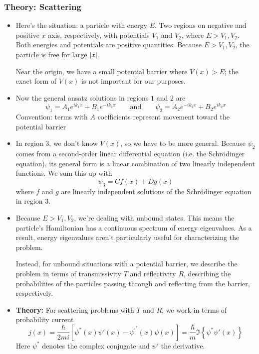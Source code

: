 \documentclass[11pt, a4paper]{article}
\newcommand{\eqtext}[1]{\qquad \text{#1} \qquad}
\newcommand{\schro}{Schr\"{o}dinger\xspace}
\begin{document}
\subsubsection{Theory: Scattering}
\begin{itemize}
	\item Here's the situation: a particle with energy $ E $. Two regions on negative and positive $ x $ axis, respectively, with potentials $ V_{1} $ and $ V_{2} $, where $ E > V_{1}, V_{2} $. Both energies and potentials are positive quantities. Because $ E > V_{1}, V_{2} $, the particle is free for large $ \abs{x} $. 
	
	Near the origin, we have a small potential barrier where $ V(x) > E $; the exact form of $ V(x) $ is not important for our purposes. 
	
	\item Now the general ansatz solutions in regions $ 1 $ and $ 2 $ are
	\begin{equation*}
		\psi_{1} = A_{1} e^{ik_{1}x} + B_{1}e^{-ik_{1}x} \eqtext{and} \psi_{2} = A_{2} e^{-ik_{2}x} + B_{2}e^{ik_{2}x}
	\end{equation*}
	Convention: terms with $ A $ coefficients represent movement toward the potential barrier 
	
	\item In region 3, we don't know $ V(x) $, so we have to be more general. Because $ \psi_{2} $ comes from a second-order linear differential equation (i.e. the \schro equation), its general form is a linear combination of two linearly independent functions. We sum this up with
	\begin{equation*}
		\psi_{3} = C f(x) + D g(x)
	\end{equation*}
	where $ f $ and $ g $ are linearly independent solutions of the \schro equation in region $ 3 $. 
	
	\item Because $ E > V_{1}, V_{2} $, we're dealing with unbound states. This means the particle's Hamiltonian has a continuous spectrum of energy eigenvalues. As a result, energy eigenvalues aren't particularly useful for characterizing the problem. 
	
	Instead, for unbound situations with a potential barrier, we describe the problem in terms of transmissivity $ T $ and reflectivity $ R $, describing the probabilities of the particles passing through and reflecting from the barrier, respectively.
	

	\item \textbf{Theory:} For scattering problems with $ T $ and $ R $, we work in terms of probability current
	\begin{equation*}
		j(x) = \frac{\hbar}{2mi}\left[\psi^{*}(x)\psi'(x) - \psi^{'^{*}}(x)\psi(x)\right] = \frac{\hbar}{m} \Im \left\{\psi^{*}\psi'(x)\right\}
	\end{equation*}
	Here $ \psi^{*} $ denotes the complex conjugate and $ \psi' $ the derivative.
	

\end{itemize}
\end{document}
